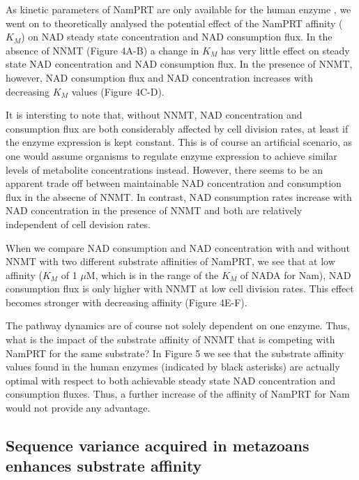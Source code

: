 As kinetic parameters of NamPRT are only available for the human enzyme \cite{Burgos2008}, we went on to theoretically analysed the potential effect of the NamPRT affinity ($K_M$) on NAD steady state concentration and NAD consumption flux. In the absence of NNMT (Figure 4A-B) a change in $K_M$ has very little effect on steady state NAD concentration and NAD consumption flux.  In the presence of NNMT, however, NAD consumption flux and NAD concentration increases with decreasing $K_M$ values (Figure 4C-D).

It is intersting to note that, without NNMT, NAD concentration and consumption flux are both considerably affected by cell division rates, at least if the enzyme expression is kept constant. This is of course an artificial scenario, as one would assume organisms to regulate enzyme expression to achieve similar levels of metabolite concentrations instead. However, there seems to be an apparent trade off between maintainable NAD concentration and consumption flux in the absecne of NNMT. In contrast,  NAD consumption rates increase with NAD concentration in the presence of NNMT and both are relatively independent of cell devision rates.

When we compare NAD consumption and NAD concentration with and without NNMT with two different substrate affinities of NamPRT, we see that at low affinity ($K_M$ of 1 $\mu$M, which is in the range of the $K_M$  of NADA for Nam), NAD consumption flux is only higher with NNMT at low cell division rates. This effect becomes stronger with decreasing affinity (Figure 4E-F).


The pathway dynamics are of course not solely dependent on one enzyme. Thus, what is the impact of the substrate affinity of NNMT that is competing with NamPRT for the same substrate? In Figure 5 we see that the substrate affinity values found in the human enzymes (indicated by black asterisks) are actually optimal with respect to both achievable steady state NAD concentration and consumption fluxes. Thus, a further increase of the affinity of NamPRT for Nam would not provide any advantage.


\subsection{Sequence variance acquired in metazoans enhances substrate affinity}

